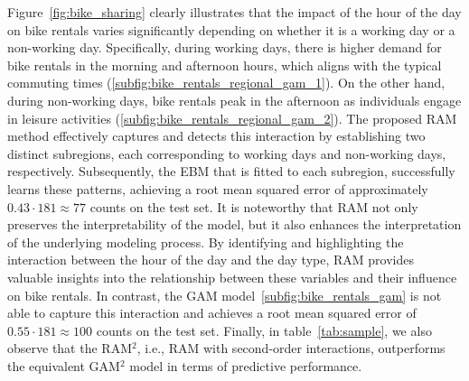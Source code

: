 \documentclass[12pt]{article}
\begin{document}
Figure~\ref{fig:bike_sharing} clearly illustrates that the impact of the hour of the day on bike rentals varies
significantly depending on whether it is a working day or a non-working day.
Specifically, during working days, there is higher demand for bike rentals in the morning and afternoon hours,
which aligns with the typical commuting times (\ref{subfig:bike_rentals_regional_gam_1}).
On the other hand, during non-working days, bike rentals peak in the afternoon as individuals engage in
leisure activities (\ref{subfig:bike_rentals_regional_gam_2}).
The proposed RAM method effectively captures and detects this interaction by establishing two distinct subregions,
each corresponding to working days and non-working days, respectively.
Subsequently, the EBM that is fitted to each subregion, successfully learns these patterns,
achieving a root mean squared error of approximately \( 0.43 \cdot 181 \approx 77\) counts on the test set.
It is noteworthy that RAM not only preserves the interpretability of the model,
but it also enhances the interpretation of the underlying modeling process.
By identifying and highlighting the interaction between the hour of the day and the day type,
RAM provides valuable insights into the relationship between these variables and their influence on bike rentals.
In contrast, the GAM model~\ref{subfig:bike_rentals_gam} is not able to capture this interaction and
achieves a root mean squared error of \( 0.55 \cdot 181 \approx 100\) counts on the test set.
Finally, in table~\ref{tab:sample}, we also observe that the RAM$^2$, i.e., RAM with second-order interactions,
outperforms the equivalent GAM$^2$ model in terms of predictive performance.
\end{document}
